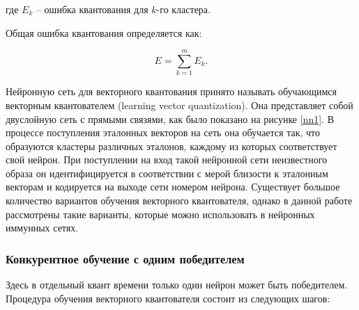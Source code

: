 \documentclass[bachelor, och, referat]{template}
\begin{document}
где $E_k$ -- ошибка квантования для $k$-го кластера.

Общая ошибка квантования определяется как:

\begin{equation}
    E = \sum_{k = 1}^{m} E_k.
\end{equation}

Нейронную сеть для векторного квантования принято называть
обучающимся векторным квантователем (learning vector quantization).
Она представляет собой двуслойную сеть с прямыми связями, как было
показано на рисунке \ref{nn1}. В процессе поступления эталонных векторов на
сеть она обучается так, что образуются кластеры различных эталонов,
каждому из которых соответствует свой нейрон. При поступлении на
вход такой нейронной сети неизвестного образа он идентифицируется
в соответствии с мерой близости к эталонным векторам и кодируется на
выходе сети номером нейрона. Существует большое количество вариантов 
обучения векторного квантователя, однако в данной работе рассмотрены такие
варианты, которые можно использовать в нейронных иммунных сетях.


\subsubsection{Конкурентное обучение с одним победителем}

Здесь в отдельный квант времени только один нейрон может быть
победителем. Процедура обучения векторного квантователя состоит из
следующих шагов:
\end{document}

